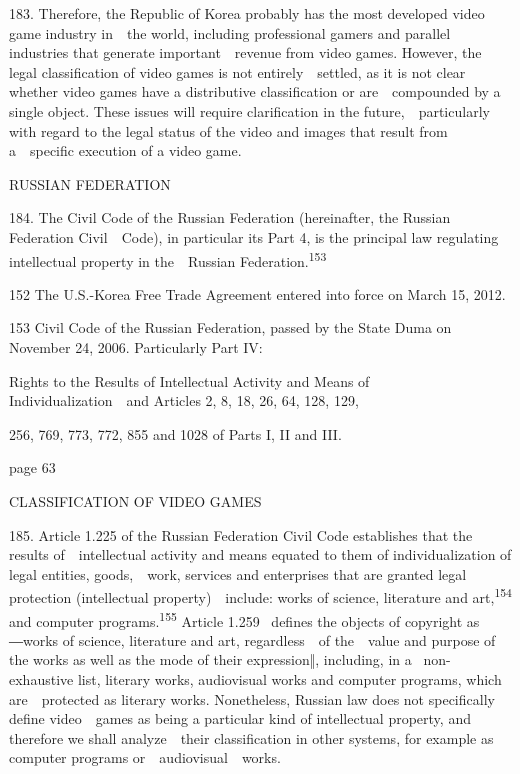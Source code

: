 \documentclass[
]{article}
\begin{document}
{183. }{Therefore, the Republic of Korea probably has the most developed
video game industry in~~the world, including professional gamers and
parallel industries that generate important~~revenue from video games.
However, the legal classification of video games is not
entirely~~settled, as it is not clear whether video games have a
distributive classification or are~~compounded by a single object. These
issues will require clarification in the future,~~particularly with
regard to the legal status of the video and images that result from
a~~specific execution of a video game.}

{RUSSIAN FEDERATION}

{184. }{The }{Civil Code of the Russian Federation }{(hereinafter, the
Russian Federation }{Civil~~Code), }{in particular its Part 4, is the
principal law regulating intellectual property in the~~Russian
Federation.}\textsuperscript{{153}}

{152 }{The U.S.-Korea Free Trade Agreement entered into force on March
15, 2012.}

{153 }{Civil Code of the Russian Federation}{, passed by the State Duma
on November 24, 2006. Particularly Part IV:}

{Rights to the Results of Intellectual Activity and Means of
Individualization~~}{and Articles 2, 8, 18, 26, 64, 128, 129,}

{256, 769, 773, 772, 855 and 1028 of Parts I, II and III.}

{page 63}

{CLASSIFICATION OF VIDEO GAMES}

{185. }{Article 1.225 of the Russian Federation }{Civil Code
}{establishes that the results of~~intellectual activity and means
equated to them of individualization of legal entities, goods,~~work,
services and enterprises that are granted legal protection (intellectual
property)~~include: works of science, literature and
art,}\textsuperscript{{154 }}{and computer
programs.}\textsuperscript{{155 }}{Article 1.259 }{~defines the objects
of copyright as ―}{works of science, literature and art, regardless~~of
the~~value and purpose of the works as well as the mode of their
expression}{‖, including, in a }{~non-exhaustive list, literary works,
audiovisual works and computer programs, which are~~protected as
literary works. Nonetheless, Russian law does not specifically define
video~~games as being a particular kind of intellectual property, and
therefore we shall analyze~~their classification in other systems, for
example as computer programs or~~audiovisual~~works.}
\end{document}
